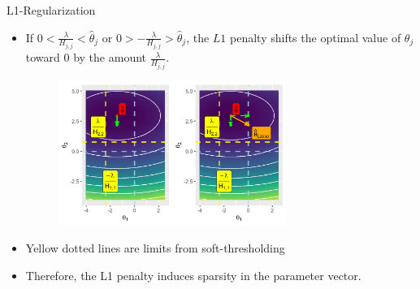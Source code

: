 \documentclass[11pt,compress,t,notes=noshow, xcolor=table]{beamer}
\begin{document}
\begin{vbframe} {L1-Regularization}
\begin{itemize}
  \end{itemize}
\framebreak
  \begin{itemize}
  
    \item If $0 < \frac{\lambda}{H_{j,j}} < \hat{\theta}_j$ or  $0 > -\frac{\lambda}{H_{j,j}} > \hat{\theta}_j$, the $L1$ penalty shifts the optimal value of $\theta_j$ toward 0 by the amount $\frac{\lambda}{H_{j,j}}$.

\vfill


\begin{figure}
\includegraphics[width=0.7\textwidth]{figure/l1_reg_hess_02.png}\\
\end{figure}
    \item Yellow dotted lines are limits from soft-thresholding

    \item Therefore, the L1 penalty induces sparsity in the parameter vector.
  \end{itemize}

  
\end{vbframe}

\endlecture
\end{document}
